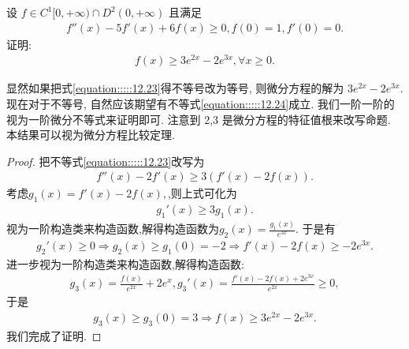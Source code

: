 \documentclass[../../main.tex]{subfiles}
\begin{document}
\begin{example}
设 $f\in C^1[0,+\infty)\cap D^2(0,+\infty)$ 且满足
\begin{align}
f''(x)-5f'(x)+6f(x)\geqslant0,f(0)=1,f'(0)=0.
\label{equation:::::12.23}
\end{align}
证明:
\begin{align}
f(x)\geqslant3e^{2x}-2e^{3x},\forall x\geqslant0.
\label{equation:::::12.24}
\end{align}
\end{example}
\begin{note}
显然如果把式\eqref{equation:::::12.23}得不等号改为等号, 则微分方程的解为 $3e^{2x}-2e^{3x}$. 现在对于不等号, 自然应该期望有不等式\eqref{equation:::::12.24}成立. 我们一阶一阶的视为一阶微分不等式来证明即可. 注意到 2,3 是微分方程的特征值根来改写命题. 本结果可以视为微分方程比较定理.
\end{note}
\begin{proof}
把不等式\eqref{equation:::::12.23}改写为
\begin{align*}
f''(x)-2f'(x)\geqslant3(f'(x)-2f(x)).
\end{align*}
考虑$g_1(x)=f'(x)-2f(x),$,则上式可化为
\begin{align*}
g_1'(x)\geqslant 3g_1(x).
\end{align*}
视为一阶构造类来构造函数,解得构造函数为$g_2(x)=\frac{g_1(x)}{e^{3x}}$.
于是有
\begin{align*}
g_2'(x)\geqslant0\Rightarrow g_2(x)\geqslant g_1(0)=-2\Rightarrow f'(x)-2f(x)\geqslant -2e^{3x}.
\end{align*}
进一步视为一阶构造类来构造函数,解得构造函数:
\begin{align*}
g_3(x)=\frac{f(x)}{e^{2x}}+2e^{x},g_3'(x)=\frac{f'(x)-2f(x)+2e^{3x}}{e^{2x}}\geqslant0,
\end{align*}
于是
\begin{align*}
g_3(x)\geqslant g_3(0)=3\Rightarrow f(x)\geqslant3e^{2x}-2e^{3x}.
\end{align*}
我们完成了证明. 

\end{proof}
\end{document}
